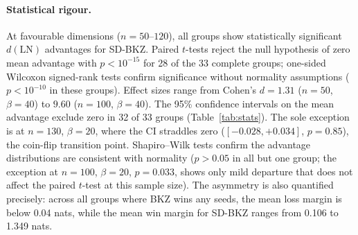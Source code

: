 \documentclass[journal=cic,version=preprint]{iacrj}
\begin{document}
\paragraph{Statistical rigour.}
At favourable dimensions ($n=50$--$120$), all groups show statistically significant $d(\mathrm{LN})$ advantages for SD-BKZ. Paired $t$-tests reject the null hypothesis of zero mean advantage with $p<10^{-15}$ for 28 of the 33 complete groups; one-sided Wilcoxon signed-rank tests confirm significance without normality assumptions ($p<10^{-10}$ in these groups). Effect sizes range from Cohen's $d=1.31$ ($n=50$, $\beta=40$) to $9.60$ ($n=100$, $\beta=40$). The 95\% confidence intervals on the mean advantage exclude zero in 32 of 33 groups (Table~\ref{tab:stats}). The sole exception is at $n=130$, $\beta=20$, where the CI straddles zero ($[-0.028, +0.034]$, $p=0.85$), the coin-flip transition point. Shapiro--Wilk tests confirm the advantage distributions are consistent with normality ($p>0.05$ in all but one group; the exception at $n=100$, $\beta=20$, $p=0.033$, shows only mild departure that does not affect the paired $t$-test at this sample size). The asymmetry is also quantified precisely: across all groups where BKZ wins any seeds, the mean loss margin is below 0.04 nats, while the mean win margin for SD-BKZ ranges from 0.106 to 1.349 nats.
\end{document}
